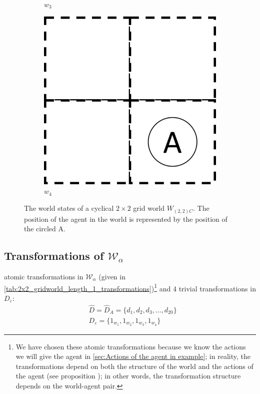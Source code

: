 \begin{figure}[H]
\begin{subfigure}[b]{0.45\linewidth}
		\caption{$w_{3}$}
	\end{subfigure}
	\begin{subfigure}[b]{0.45\linewidth}
		\centering
		\includegraphics[width=0.5\linewidth]{2MathematicalFramework/Images/2x2_no_walls_world_states/w3.png}
		\caption{$w_{4}$}
	\end{subfigure}
	\caption{
        The world states of a cyclical $2\times 2$ grid world $W_{(2,2)C}$.
        The position of the agent in the world is represented by the position of the circled A.
        }
	\label{fig:2x2-cyclical-grid-world-states}
\end{figure}

\subsection{Transformations of $\mathscr{W}_{\alpha}$}

 atomic transformations in $\mathscr{W}_{\alpha}$ (given in \cref{tab:2x2_gridworld_length_1_transformations})\footnote{
    We have chosen these atomic transformations because we know the actions we will give the agent in \cref{sec:Actions of the agent in example}; in reality, the transformations depend on both the structure of the world and the actions of the agent (see proposition ); in other words, the transformation structure depends on the world-agent pair.
}
and 4 trivial transformations in $D_{\varepsilon}$:
\begin{align}
    & \hat{D} = \hat{D}_{A} = \{ d_{1}, d_{2}, d_{3}, \dots, d_{20} \} \\
    & D_{\varepsilon} = \{1_{w_{1}}, 1_{w_{2}}, 1_{w_{3}}, 1_{w_{4}} \}
    \label{eqn:list_of_D_epsilon}
\end{align}

